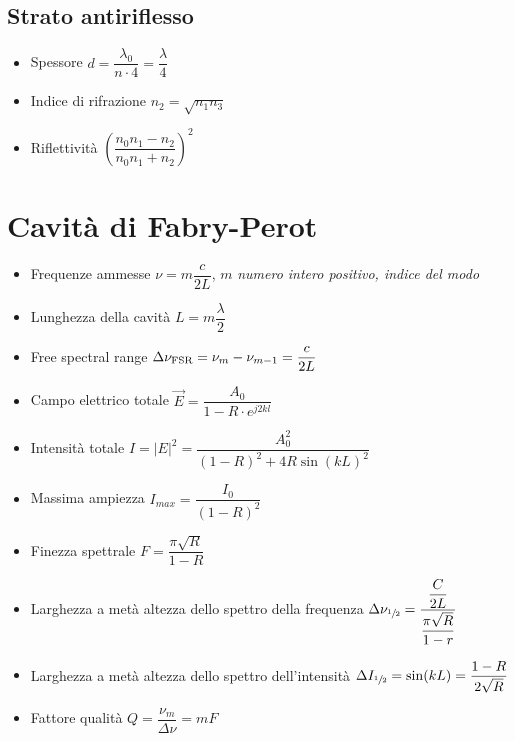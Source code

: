 \documentclass{article}
\begin{document}
\subsection{Strato antiriflesso}
\begin{itemize}
  \item Spessore \( d = \dfrac{\lambda_0}{n \cdot 4} = \dfrac{\lambda}{4} \)
  \item Indice di rifrazione \( n_2 = \sqrt{n_1 n_3} \)
  \item Riflettività \( \left( \dfrac{n_0 n_1 - n_2 }{n_0 n_1 + n_ 2} \right) ^ 2 \)
\end{itemize}

\newpage

\section {Cavità di Fabry-Perot}
\begin{itemize}
  \item Frequenze ammesse \(  \nu = m \dfrac{c}{2L} \), \( m \) \textit{numero intero positivo, indice del modo}
  \item Lunghezza della cavità \( L = m \dfrac{\lambda}{2} \)
  \item Free spectral range \( \Delta \nu_{\textnormal{FSR}} = \nu_{m} - \nu_{m-1} = \dfrac{c}{2L} \)
  \item Campo elettrico totale \( \vec{E} = \dfrac{A_0}{1-R \cdot e^ {j 2 k l}} \)
  \item Intensità totale \( I = | E | ^ 2 = \dfrac{A_0^2}{(1-R)^2+ 4 R \sin(kL)^2} \)
  \item Massima ampiezza \( I_{max} = \dfrac{I_0}{(1-R)^2} \)
  \item Finezza spettrale \( F = \dfrac{\pi \sqrt{R}}{1-R} \)
  \item Larghezza a metà altezza dello spettro della frequenza \(\Delta \nu_{\sfrac{1}{2}} = \dfrac{\dfrac{C}{2L}}{\dfrac{\pi \sqrt{R}}{1 - r}} \)
  \item Larghezza a metà altezza dello spettro dell'intensità \(\Delta I_{\sfrac{1}{2}} = \sin(k L) = \dfrac{1 - R}{2 \sqrt{R}} \)
  \item Fattore qualità \( Q = \dfrac{\nu_m}{\Delta \nu} = m F \)
\end{itemize}

\newpage
\end{document}
